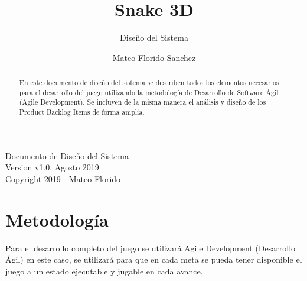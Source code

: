 \documentclass[letterpaper]{scrreprt}
\title{Snake 3D}
\subtitle{Diseño del Sistema}
\author{Mateo Florido Sanchez}
\begin{document}
\restoregeometry %
\nopagecolor%

\maketitle
\noindent
Documento de Diseño del Sistema\\ 
Version v1.0, Agosto 2019\\
Copyright 2019 - Mateo Florido\\
\newpage

\begin{abstract}
	En este documento de diseño del sistema se describen todos los elementos necesarios para el desarrollo del juego utilizando la metodología de Desarrollo de Software Ágil (Agile Development). Se incluyen de la misma manera el análisis y diseño de los Product Backlog Items de forma amplia.
\end{abstract}

\tableofcontents

\chapter{Metodología}

Para el desarrollo completo del juego se utilizará Agile Development (Desarrollo Ágil)  en este caso, se utilizará para que en cada meta se pueda tener disponible el juego a un estado ejecutable y jugable en cada avance.
\end{document}
